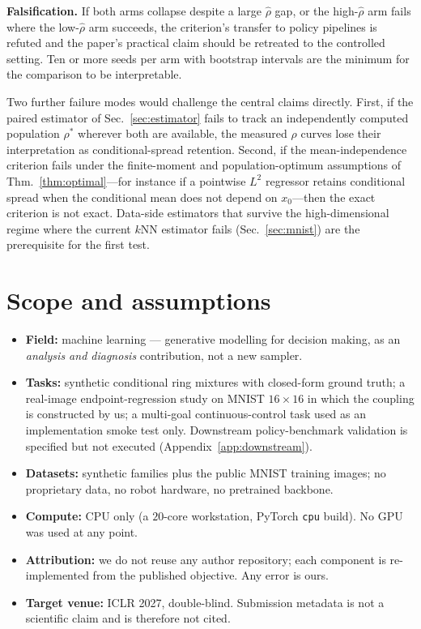 \documentclass{article}
\theoremstyle{plain}
\begin{document}
\textbf{Falsification.} If both arms collapse despite a large $\hat\rho$ gap, or the
high-$\hat\rho$ arm fails where the low-$\hat\rho$ arm succeeds, the criterion's
transfer to policy pipelines is refuted and the paper's practical claim should be
retreated to the controlled setting. Ten or more seeds per arm with bootstrap
intervals are the minimum for the comparison to be interpretable.

Two further failure modes would challenge the central claims directly. First, if the
paired estimator of Sec.~\ref{sec:estimator} fails to track an independently computed
population $\rho^\ast$ wherever both are available, the measured $\rho$ curves lose their
interpretation as conditional-spread retention. Second, if the mean-independence
criterion fails under the finite-moment and population-optimum assumptions of
Thm.~\ref{thm:optimal}---for instance if a pointwise $L^2$ regressor retains conditional
spread when the conditional mean does not depend on $x_0$---then the exact criterion is
not exact. Data-side estimators that survive the high-dimensional regime where the current
$k$NN estimator fails (Sec.~\ref{sec:mnist}) are the prerequisite for the first test.

\section{Scope and assumptions}
\label{app:scope}
\begin{itemize}
  \item \textbf{Field:} machine learning --- generative modelling for decision making,
  as an \emph{analysis and diagnosis} contribution, not a new sampler.
  \item \textbf{Tasks:} synthetic conditional ring mixtures with closed-form ground
  truth; a real-image endpoint-regression study on MNIST $16\!\times\!16$
  \citep{lecun1998mnist} in which the coupling is constructed by us; a multi-goal
  continuous-control task used as an implementation smoke test only. Downstream
  policy-benchmark validation is specified but not executed
  (Appendix~\ref{app:downstream}).
  \item \textbf{Datasets:} synthetic families plus the public MNIST training images;
  no proprietary data, no robot hardware, no pretrained backbone.
  \item \textbf{Compute:} CPU only (a $20$-core workstation, PyTorch \texttt{cpu}
  build). No GPU was used at any point.
  \item \textbf{Attribution:} we do not reuse any author repository; each component is
  re-implemented from the published objective. Any error is ours.
  \item \textbf{Target venue:} ICLR 2027, double-blind. Submission metadata is not a
  scientific claim and is therefore not cited.
\end{itemize}
\end{document}

